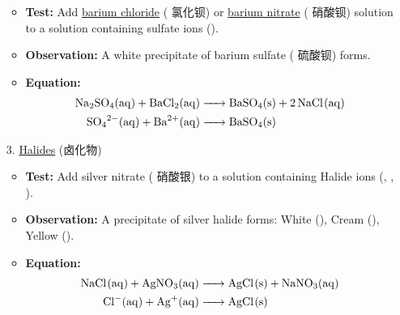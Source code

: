 \begin{itemize}
\begin{itemize}
        \item \textbf{Test:} Add \underline{barium chloride} ( 氯化钡) or \underline{barium nitrate} (
        硝酸钡) solution to a solution containing sulfate ions ().
        \item \textbf{Observation:} A white precipitate of barium sulfate ( 硫酸钡) forms.
        \item \textbf{Equation:}
        \begin{equation}
            \begin{split}
                \ce{Na2SO4(aq) + BaCl2(aq) &-> BaSO4(s) + 2NaCl(aq)}\\
                \ce{SO4^2-(aq) + Ba^2+(aq) &-> BaSO4(s)}
            \end{split}
        \end{equation}
    \end{itemize}
    \item[3.] \underline{Halides} (卤化物)
    \begin{itemize}
        \item \textbf{Test:} Add silver nitrate ( 硝酸银) to a solution containing Halide ions (, ,
        ).
        \item \textbf{Observation:} A precipitate of silver halide forms: White (), Cream (), Yellow ().
        \item \textbf{Equation:}
        \begin{equation}
            \begin{split}
                \ce{NaCl(aq) + AgNO3(aq) &-> AgCl(s) + NaNO3(aq)}\\
                \ce{Cl-(aq) + Ag+(aq) &-> AgCl(s)}
            \end{split}
        \end{equation}
    \end{itemize}
\end{itemize}

